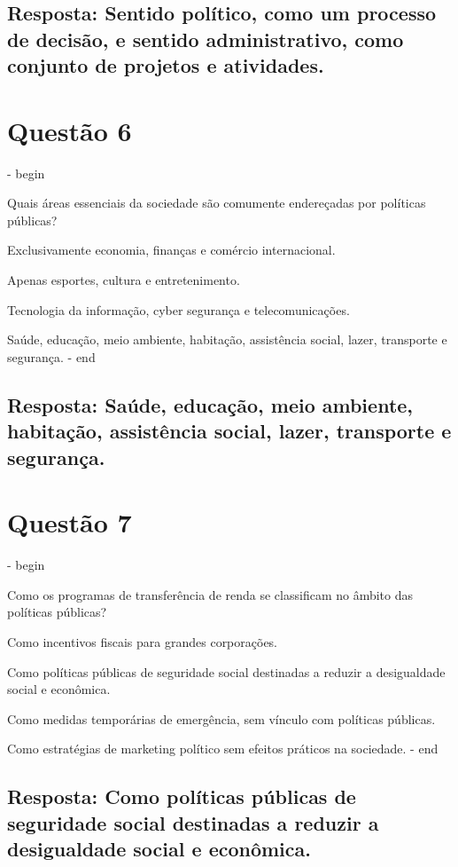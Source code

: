 \documentclass[
   article,       
   12pt,          
   oneside,       
   a4paper,       
   english,       
   brazil,        
   sumario=tradicional
   ]{abntex2}
\begin{document}
\subsection{Resposta: Sentido político, como um processo de decisão, e sentido administrativo, como conjunto de projetos e atividades.}

\section{Questão 6}
\itemize - begin
\item Quais áreas essenciais da sociedade são comumente endereçadas por políticas públicas?
\item Exclusivamente economia, finanças e comércio internacional.
\item Apenas esportes, cultura e entretenimento.
\item Tecnologia da informação, cyber segurança e telecomunicações.
\item Saúde, educação, meio ambiente, habitação, assistência social, lazer, transporte e segurança.
\itemize - end
\subsection{Resposta: Saúde, educação, meio ambiente, habitação, assistência social, lazer, transporte e segurança.}

\section{Questão 7}
\itemize - begin
\item Como os programas de transferência de renda se classificam no âmbito das políticas públicas?
\item Como incentivos fiscais para grandes corporações.
\item Como políticas públicas de seguridade social destinadas a reduzir a desigualdade social e econômica.
\item Como medidas temporárias de emergência, sem vínculo com políticas públicas.
\item Como estratégias de marketing político sem efeitos práticos na sociedade.
\itemize - end
\subsection{Resposta: Como políticas públicas de seguridade social destinadas a reduzir a desigualdade social e econômica.}
\end{document}
